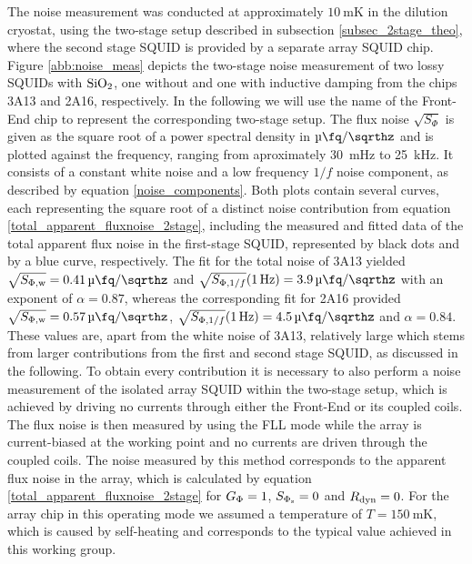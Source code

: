 The noise measurement was conducted at approximately $\qty{10}{\milli\kelvin}$ in the dilution cryostat, using the two-stage setup described in subsection \ref{subsec_2stage_theo}, where the second stage SQUID is provided by a separate array SQUID chip. Figure \ref{abb:noise_meas} depicts the two-stage noise measurement of two lossy SQUIDs with ${\rm SiO_2}$, one without and one with inductive damping from the chips 3A13 and 2A16, respectively. In the following we will use the name of the Front-End chip to represent the corresponding two-stage setup. The flux noise $\sqrt{S_\Phi}$ is given as the square root of a power spectral density in $\unit{\micro\fq\per\sqrthz}$
and is plotted against the frequency, ranging from aproximately \qty{30}{\milli\hertz} to \qty{25}{\kHz}. It consists of a constant white noise and a low frequency $1/f$ noise component, as described by equation \ref{noise_components}. Both plots contain several curves, each representing the square root of a distinct noise contribution from equation \ref{total_apparent_fluxnoise_2stage}, including the measured and fitted data of the total apparent flux noise in the first-stage SQUID, represented by black dots and by a blue curve, respectively. The fit for the total noise of 3A13 yielded $\sqrt{S_{\rm \Phi,w}}=\qty{0.41}{\micro\fq\per\sqrthz}$ and $\sqrt{S_{{\rm \Phi},1/f}}(\qty{1}{\Hz})=\qty{3.9}{\micro\fq\per\sqrthz}$ with an exponent of $\alpha=0.87$, whereas the corresponding fit for 2A16 provided $\sqrt{S_{\rm \Phi,w}}=\qty{0.57}{\micro\fq\per\sqrthz}$, $\sqrt{S_{{\rm \Phi},1/f}}(\qty{1}{\Hz})=\qty{4.5}{\micro\fq\per\sqrthz}$ and $\alpha=0.84$. These values are, apart from the white noise of 3A13, relatively large which stems from larger contributions from the first and second stage SQUID, as discussed in the following. To obtain every contribution it is necessary to also perform a noise measurement of the isolated array SQUID within the two-stage setup, which is achieved by driving no currents through either the Front-End or its coupled coils. The flux noise is then measured by using the FLL mode while the array is current-biased at the working point and no currents are driven through the coupled coils. The noise measured by this method corresponds to the apparent flux noise in the array, which is calculated by equation  \ref{total_apparent_fluxnoise_2stage} for $G_{\rm \Phi}=1$, $S_{\rm \Phi_s}=0$ and $R_{\rm dyn}=0$. For the array chip in this operating mode we assumed a temperature of $T=\qty{150}{\milli\kelvin}$, which is caused by self-heating and corresponds to the typical value achieved in this working group.
